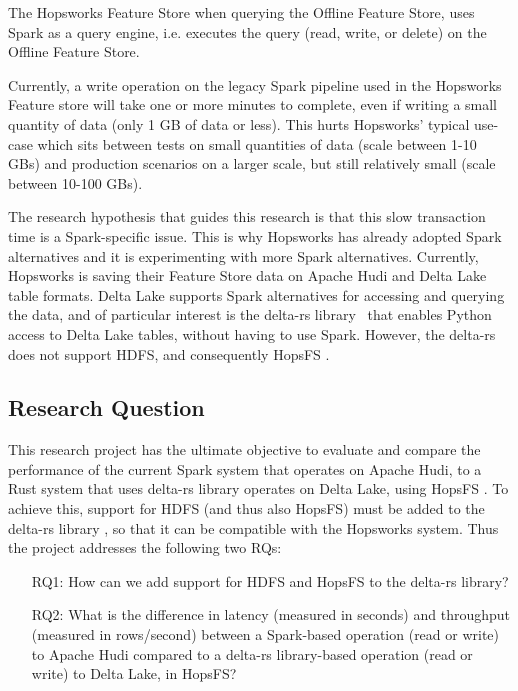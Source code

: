 The Hopsworks Feature Store \cite{HopsworksBatchRealtime2024} when querying the Offline Feature Store, uses Spark as a query engine, i.e. executes the query (read, write, or delete) on the Offline Feature Store.

Currently, a write operation on the legacy Spark pipeline used in the Hopsworks Feature store will take one or more minutes to complete, even if writing a small quantity of data (only 1 GB of data or less).
This hurts Hopsworks' typical use-case which sits between tests on small quantities of data (scale between 1-10 GBs) and production scenarios on a larger scale, but still relatively small (scale between 10-100 GBs).

The research hypothesis that guides this research is that this slow transaction time is a Spark-specific issue. This is why Hopsworks has already adopted Spark alternatives \cite{Khazanchi1801362} and it is experimenting with more Spark alternatives. Currently, Hopsworks is saving their Feature Store data on Apache Hudi and Delta Lake table formats. Delta Lake supports Spark alternatives for accessing and querying the data, and of particular interest is the delta-rs library~\cite{DeltaioDeltars2024} that enables Python access to Delta Lake tables, without having to use Spark. 
However, the delta-rs \cite{DeltaioDeltars2024} does not support \gls{HDFS}, and consequently \gls{HopsFS} \cite{niaziHopsFSScalingHierarchical2017}.

\subsection{Research Question}
\label{subsec:researchQuestion}
This research project has the ultimate objective to evaluate and compare the performance of the current Spark system that operates on Apache Hudi, to a Rust system that uses delta-rs library \cite{DeltaioDeltars2024} operates on Delta Lake, using \gls{HopsFS} \cite{niaziHopsFSScalingHierarchical2017}. To achieve this, support for \gls{HDFS} (and thus also \gls{HopsFS}) must be added to the delta-rs library \cite{DeltaioDeltars2024}, so that it can be compatible with the Hopsworks system. Thus the project addresses the following two \glspl{RQ}:
\begin{enumerate}
    \item[RQ1:] How can we add support for \gls{HDFS} and \gls{HopsFS} to the delta-rs library?
    \item[RQ2:] What is the difference in latency (measured in seconds) and throughput (measured in rows/second) between a Spark-based operation (read or write) to Apache Hudi compared to a delta-rs library-based operation (read or write) to Delta Lake, in \gls{HopsFS}?  
\end{enumerate}

